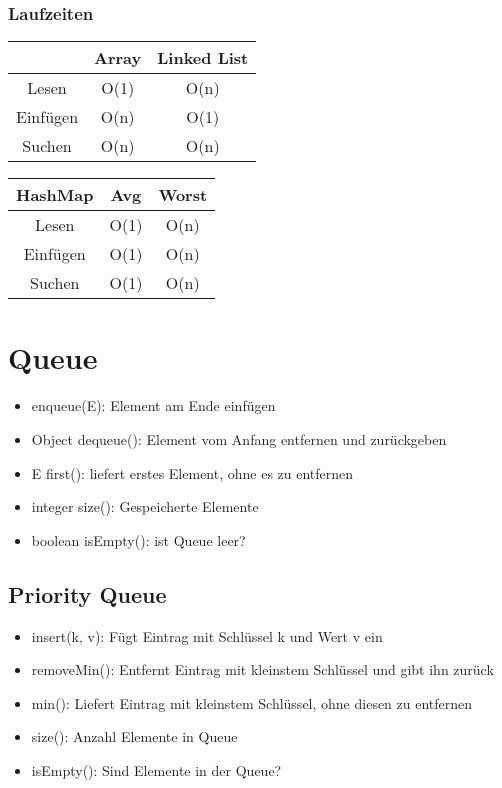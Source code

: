 \begin{multicols*}{4}
	\subsubsection{Laufzeiten}

		\begin{tabular}{c | c | c}
			& Array & Linked List \\
			\hline
			Lesen & O(1) & O(n) \\
			Einfügen & O(n) & O(1)  \\
			Suchen & O(n) & O(n) \\
		\end{tabular}
	
		\begin{tabular}{c | c | c}
			\textbf{HashMap} & Avg & Worst \\
			\hline
			Lesen & O(1) & O(n) \\
			Einfügen & O(1) & O(n)  \\
			Suchen & O(1) & O(n) \\
		\end{tabular}

\section{Queue}
	\begin{itemize}
		\item enqueue(E): Element am Ende einfügen
		\item Object dequeue(): Element vom Anfang entfernen und
		zurückgeben
		\item E first(): liefert erstes Element, ohne es zu entfernen
		\item integer size(): Gespeicherte Elemente
		\item boolean isEmpty(): ist Queue leer?
	\end{itemize}

	\subsection{Priority Queue}
		\begin{itemize}
			\item insert(k, v): Fügt Eintrag mit Schlüssel k und Wert v ein
			\item removeMin(): Entfernt Eintrag mit kleinstem Schlüssel und gibt ihn zurück
			\item min(): Liefert Eintrag mit kleinstem Schlüssel, ohne diesen zu entfernen
			\item size(): Anzahl Elemente in Queue
			\item isEmpty(): Sind Elemente in der Queue?
		\end{itemize}
		

\end{multicols*}
